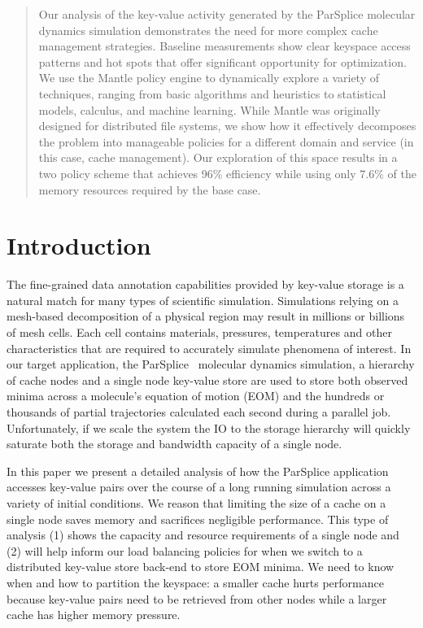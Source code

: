 \begin{abstract}

Our analysis of the key-value activity generated by the ParSplice molecular
dynamics simulation demonstrates the need for more complex cache management
strategies. Baseline measurements show clear keyspace access patterns and hot
spots that offer significant opportunity for optimization. We use the Mantle
policy engine to dynamically explore a variety of techniques, ranging from
basic algorithms and heuristics to statistical models, calculus, and machine
learning. While Mantle was originally designed for distributed file systems, we
show how it effectively decomposes the problem into manageable policies for a
different domain and service (in this case, cache management).  Our exploration
of this space results in a two policy scheme that achieves 96\% efficiency
while using only 7.6\% of the memory resources required by the base case. 

\end{abstract}



\section{Introduction}

The fine-grained data annotation capabilities provided by key-value storage is
a natural match for many types of scientific simulation. Simulations relying on
a mesh-based decomposition of a physical region may result in millions or
billions of mesh cells. Each cell contains materials, pressures, temperatures
and other characteristics that are required to accurately simulate phenomena of
interest. In our target application, the
ParSplice~\cite{perez:jctc20150parsplice} molecular dynamics simulation, a
hierarchy of cache nodes and a single node key-value store are used to store
both observed minima across a molecule's equation of motion (EOM) and the
hundreds or thousands of partial trajectories calculated each second during a
parallel job. Unfortunately, if we scale the system the IO to the storage
hierarchy will quickly saturate both the storage and bandwidth capacity of a
single node. 

In this paper we present a detailed analysis of how the ParSplice application
accesses key-value pairs over the course of a long running simulation across a
variety of initial conditions. We reason that limiting the size of a cache on a
single node saves memory and sacrifices negligible performance. This type of
analysis (1) shows the capacity and resource requirements of a single node and
(2) will help inform our load balancing policies for when we switch to a
distributed key-value store back-end to store EOM minima. We need to know when
and how to partition the keyspace: a smaller cache hurts performance because
key-value pairs need to be retrieved from other nodes while a larger cache has
higher memory pressure.

